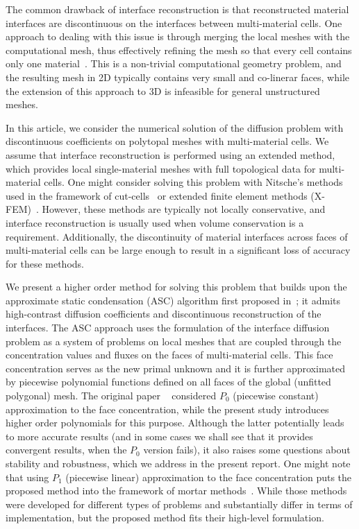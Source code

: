 \documentclass[12pt]{article}
\begin{document}
    The common drawback of interface reconstruction is that reconstructed material interfaces are discontinuous on the interfaces between multi-material cells. One approach to dealing with this issue is through merging the local meshes with the computational mesh, thus effectively refining the mesh so that every cell contains only one material~\cite{garimella2011supermesh}. This is a non-trivial computational geometry problem, and the resulting mesh in 2D typically contains very small and co-linerar faces, while the extension of this approach to 3D is infeasible for general unstructured meshes.
    
	In this article, we consider the numerical solution of the diffusion problem with discontinuous coefficients on polytopal meshes with multi-material cells. We assume that interface reconstruction is performed using an extended method, which provides local single-material meshes with full topological data for multi-material cells. One might consider solving this problem with Nitsche’s methods used in the framework of cut-cells~\cite{dolbow2012nitsche, burman2015cutfem, hansbo2002unfitted} or extended finite element methods (X-FEM)~\cite{dolbow2008xfem}. However, these methods are typically not locally conservative, and interface reconstruction is usually used when volume conservation is a requirement. Additionally, the discontinuity of material interfaces across faces of multi-material cells can be large enough to result in a significant loss of accuracy for these methods.
	
	We present a higher order method for solving this problem that builds upon the approximate static condensation (ASC) algorithm first proposed in~\cite{kikinzon2017approximate}; it admits high-contrast diffusion coefficients and discontinuous reconstruction of the interfaces. The ASC approach uses the formulation of the interface diffusion problem as a system of problems on local meshes that are coupled through the concentration values and fluxes on the faces of multi-material cells. This face concentration serves as the new primal unknown and it is further approximated by piecewise  polynomial functions defined on all faces of the global (unfitted polygonal) mesh. The original paper ~\cite{kikinzon2017approximate} considered $P_0$ (piecewise constant) approximation to the face concentration, while the present study introduces higher order polynomials for this purpose.
	Although the latter potentially leads to more accurate results  (and in some cases we shall see that it provides convergent results, when the $P_0$ version fails), it also raises some questions about stability and robustness, which we address in the present report.
	One might note that using $P_1$ (piecewise linear) approximation to the face concentration puts the proposed method into the framework of mortar methods~\cite{yotov2009mortar,mortar}. While those methods were developed for different types of problems and substantially differ in terms of implementation, but the proposed method fits their high-level formulation.
	
\end{document}
